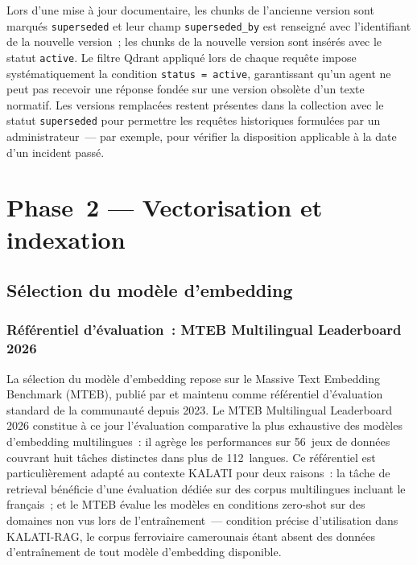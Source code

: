 \documentclass[12pt,a4paper]{report}
\begin{document}
Lors d'une mise à jour documentaire, les chunks de l'ancienne version sont marqués
\texttt{superseded} et leur champ \texttt{superseded\_by} est renseigné avec l'identifiant de
la nouvelle version~; les chunks de la nouvelle version sont insérés avec le statut
\texttt{active}. Le filtre Qdrant appliqué lors de chaque requête impose systématiquement la
condition \texttt{status = active}, garantissant qu'un agent ne peut pas recevoir une réponse
fondée sur une version obsolète d'un texte normatif. Les versions remplacées restent présentes
dans la collection avec le statut \texttt{superseded} pour permettre les requêtes historiques
formulées par un administrateur~--- par exemple, pour vérifier la disposition applicable à la
date d'un incident passé.

\section{Phase~2 --- Vectorisation et indexation}

\subsection{Sélection du modèle d'embedding}

\subsubsection*{Référentiel d'évaluation~: MTEB Multilingual Leaderboard 2026}

La sélection du modèle d'embedding repose sur le Massive Text Embedding Benchmark (MTEB),
publié par \textcite{Muennighoff2023} et maintenu comme référentiel d'évaluation standard de la
communauté depuis 2023. Le MTEB Multilingual Leaderboard 2026 constitue à ce jour l'évaluation
comparative la plus exhaustive des modèles d'embedding multilingues~: il agrège les performances
sur 56~jeux de données couvrant huit tâches distinctes dans plus de 112~langues. Ce référentiel
est particulièrement adapté au contexte KALATI pour deux raisons~: la tâche de retrieval
bénéficie d'une évaluation dédiée sur des corpus multilingues incluant le français~; et le MTEB
évalue les modèles en conditions zero-shot sur des domaines non vus lors de l'entraînement~---
condition précise d'utilisation dans KALATI-RAG, le corpus ferroviaire camerounais étant absent
des données d'entraînement de tout modèle d'embedding disponible.
\end{document}
